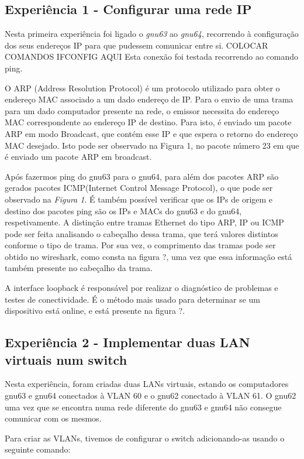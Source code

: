 \documentclass[article, a4paper, 11pt, oneside]{memoir}
\begin{document}
\subsection{Experiência 1 - Configurar uma rede IP}

Nesta primeira experiência foi ligado o \emph{gnu63} ao \emph{gnu64}, recorrendo à configuração dos seus endereços IP para que pudessem comunicar entre si. 
COLOCAR COMANDOS IFCONFIG AQUI
Esta conexão foi testada recorrendo ao comando ping.

O ARP (Address Resolution Protocol) é um protocolo utilizado para obter o endereço MAC associado
a um dado endereço de IP. Para o envio de uma trama para um dado computador presente na rede, o emissor
necessita do endereço MAC correspondente ao endereço IP de destino. Para isto, é enviado um pacote ARP
em modo Broadcast, que contém esse IP e que espera o retorno do endereço MAC desejado.
Isto pode ser observado na Figura 1, no pacote número 23 em que é enviado um pacote ARP em broadcast.

Após fazermos ping do gnu63 para o gnu64, para além dos pacotes ARP são gerados pacotes ICMP(Internet Control Message Protocol), 
o que pode ser observado na \emph{Figura 1}.
É também possível verificar que os IPs de origem e destino dos pacotes ping são os IPs e MACs do gnu63 e do gnu64, respetivamente.
A distinção entre tramas Ethernet do tipo ARP, IP ou ICMP pode ser feita analisando o cabeçalho dessa trama, que terá valores distintos conforme o tipo de trama.
Por sua vez, o comprimento das tramas pode ser obtido no wireshark, como consta na figura ?, uma vez que essa informação está também presente no cabeçalho da trama.

A interface loopback é responsável por realizar o diagnóstico de problemas e testes de conectividade.
É o método mais usado para determinar se um dispositivo está online, e está presente na figura ?.


\subsection{Experiência 2 - Implementar duas LAN virtuais num switch}

Nesta experiência, foram criadas duas LANs virtuais, estando os computadores gnu63 e gnu64 conectados à VLAN 60 e o gnu62 conectado à VLAN 61.
O gnu62 uma vez que se encontra numa rede diferente do gnu63 e gnu64 não consegue comunicar com os mesmos.

Para criar as VLANs, tivemos de configurar o switch adicionando-as usando o seguinte comando:
\end{document}
